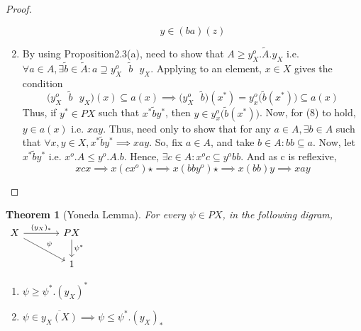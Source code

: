 \documentclass[18pt,a4paper]{article}
\newtheorem{theorem}{Theorem}[section]
\theoremstyle{definition}
\begin{document}
\begin{proof}
\begin{enumerate}[label=(\alph*)]
\[		y \in (ba)(z)\]
	\item By using Proposition2.3(a), need to show that $A\geq y_X^o.\tilde{A}.y_X$ i.e. $\forall
		a\in A, \exists \tilde{b}\in \tilde{A} :  a \supseteq y_X^o \text{ } \tilde{b} \text{ } y_X $.
		Applying to an element, $x\in X$ gives the condition
		\begin{equation}
			\Big( y_X^o \text{ } \tilde{b} \text{ } y_X \Big)(x) \subseteq a(x)
			\implies \Big( y_X^o \text{ } \tilde{b} \Big) (x^*)= y_x^o
			\Big(\tilde{b}(x^*)\Big) \subseteq a(x)
		\end{equation}
		Thus, if $y^* \in PX$ such that $x^* \tilde{b} y^*$, then
		$y \in y_x^o\Big(\tilde{b}(x^*)\Big)$. Now, for (8) to hold, $y \in a(x)$ i.e. $xay$. Thus,
		need only to show that for any $a\in A, \exists b \in A $ such that $\forall x,y \in X,
		x^* \tilde{b}y^* \implies xay $. So, fix $a\in A$, and take $b \in A: bb \subseteq a$.
		Now, let $x^* \tilde{b}y^*$ i.e. $x^o.A \leq y^o .A .b$.
		Hence, $\exists c \in A: x^oc \subseteq y^o bb$. And as c is reflexive,
		\[ xcx \implies x(cx^o)\star \implies x(bby^o)\star \implies x(bb)y \implies xay \]




\end{enumerate}
\end{proof}
\begin{theorem}[Yoneda Lemma] %
For every $\psi \in PX$, in the following digram,
$\begin{tikzcd}[column sep=large ]
	X \arrow{r}{(y_X)_*}  \arrow{rd}{\psi}
  & PX \arrow{d}{\psi^*} \\
    & 1
\end{tikzcd}$
\begin{enumerate}[label=(\alph*)]
		\item $\psi \geq \psi^*.(y_X)^*$
		\item $\psi \in \overline{y_X(X)} \implies \psi \leq \psi^*.(y_X)_*$
	\end{enumerate}
\end{theorem}
\end{document}
